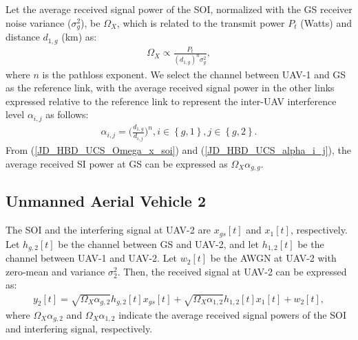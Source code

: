 Let the average received signal power of the SOI, normalized with the GS receiver noise variance ($\sigma_g^2$), be $\Omega_{X}$, which is related to the transmit power $P_{t}$ (Watts) and distance $d_{1,g}$ (km) as:
\begin{eqnarray} \label{JD_HBD_UCS_Omega_x_soi}
\Omega_{X} \propto \frac{P_t}{\left(d_{1,g}\right)^{n}\sigma_g^2},
\end{eqnarray}
where $n$ is the pathloss exponent. We select the channel between UAV-1 and GS as the reference link, with the average received signal power in the other links expressed relative to the reference link to represent the inter-UAV interference level $\alpha_{i,j}$ as follows:
\begin{eqnarray} \label{JD_HBD_UCS_alpha_i_j}
\alpha_{i,j} = \bigg(\frac{d_{1,g}}{d_{i,j}}\bigg)^n, i\in\left\{g,1\right\}, j\in\left\{g,2\right\}.
\end{eqnarray}
From (\ref{JD_HBD_UCS_Omega_x_soi}) and (\ref{JD_HBD_UCS_alpha_i_j}), the average received SI power at GS can be expressed as $\Omega_X\alpha_{g,g}$. 

\subsection{Unmanned Aerial Vehicle 2}

The SOI and the interfering signal at UAV-2 are $x_{gs}[t]$ and $x_1[t]$, respectively. Let $h_{g,2}[t]$ be the channel between GS and UAV-2, and let $h_{1,2}[t]$ be the channel between UAV-1 and UAV-2. Let $w_{2}[t]$ be the AWGN at UAV-2 with zero-mean and variance $\sigma_2^2$. Then, the received signal at UAV-2 can be expressed as:
\begin{eqnarray} \label{JD_HBD_UCS_y_as2}
y_{2}[t] = \sqrt{\Omega_{X}\alpha_{g,2}}h_{g,2}[t]x_{gs}[t] + \sqrt{\Omega_{X}\alpha_{1,2}}h_{1,2}[t]x_{1}[t] +  w_{2}[t], 
\end{eqnarray}
where $\Omega_{X}\alpha_{g,2}$ and $\Omega_{X}\alpha_{1,2}$ indicate the average received signal powers of the SOI and interfering signal, respectively. 

